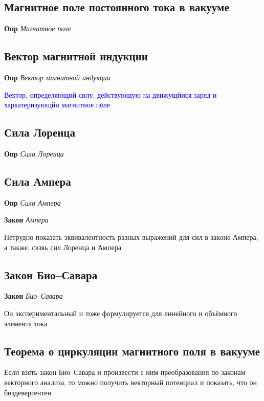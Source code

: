 \documentclass[a4paper, 14pt]{article}
\begin{document}
    \subsection{Магнитное поле постоянного тока в вакууме}
    
    \textbf{Опр} \textit{Магнитное поле}
    
    \subsection{Вектор магнитной индукции}
    
    \textbf{Опр} \textit{Вектор магнитной индукции}
    
    \textcolor{blue}{Вектор, определяющий силу, действующую на движущйися заряд и харкатеризующйи магнитное поле}
    
    \subsection{Сила Лоренца}
    
    \textbf{Опр} \textit{Сила Лоренца}
    
    \subsection{Сила Ампера}
    
    \textbf{Опр} \textit{Сила Ампера}
    
    \textbf{Закон} \textit{Ампера}
    
    Нетрудно показать эквивалентность разных выражений для сил в законе Ампера, а также, свзяь сил Лоренца и Ампера
    
    \subsection{Закон Био–Савара}
    
    \textbf{Закон} \textit{Био–Савара}
    
    Он экспериментальный и тоже формулируется для линейного и объёмного элемента тока
    
    \subsection{Теорема о циркуляции магнитного поля в вакууме}
    
    Если взять закон Био–Савара и произвести с ним преобразования по законам векторного анализа, то можно получить
    векторный потенциал и показать, что он биздевергентен
    
\end{document}
